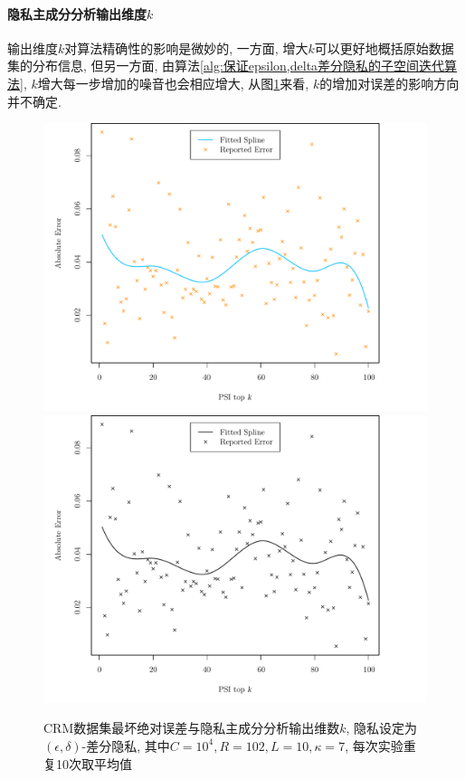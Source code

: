 \paragraph{隐私主成分分析输出维度$k$} %
\label{par:隐私主成分分析输出维度_k_}
输出维度$k$对算法精确性的影响是微妙的, 一方面, 增大$k$可以更好地概括原始数据集的分布信息, 但另一方面, 由算法\ref{alg:保证epsilon,delta差分隐私的子空间迭代算法}, $k$增大每一步增加的噪音也会相应增大, 从图\ref{fig:CRM数据集最坏绝对误差与隐私主成分分析输出维数_k}来看, $k$的增加对误差的影响方向并不确定. 
\begin{figure}[hbtp]\centering
  \caption{CRM数据集最坏绝对误差与隐私主成分分析输出维数$k$, 隐私设定为$(\epsilon, \delta)$-差分隐私, 其中$C=10^4, R = 102, L = 10, \kappa = 7$, 每次实验重复10次取平均值 }\label{fig:CRM数据集最坏绝对误差与隐私主成分分析输出维数_k}
  \makeatletter
  \ifpkuthssextra@opt@colorlinks
  \includegraphics[width=140mm]{fig/fig_CRM.pdf}
  \else
  \includegraphics[width=140mm]{fig/fig_CRM_bw.pdf}
  \fi
  \makeatother
\end{figure}
